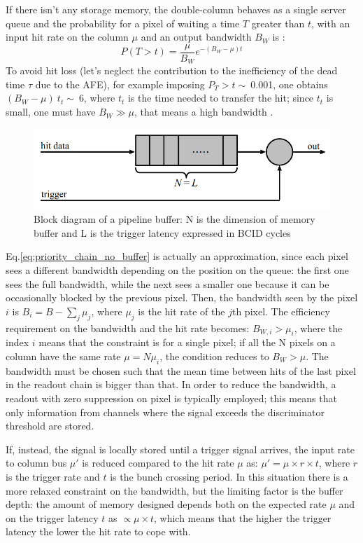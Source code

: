    If there isn't any storage memory, the double-column behaves as a single server queue and the probability for a pixel of waiting a time $T$ greater than $t$, with an input hit rate on the column $\mu$ and an output bandwidth $B_W$ is \cite{Garcia-Review}:
   \begin{equation}
   P(T > t) = \frac{\mu}{B_W} e^{-( B_W-\mu )t}
   \label{eq:priority_chain_no_buffer}
   \end{equation}
   To avoid hit loss (let's neglect the contribution to the inefficiency of the dead time $\tau$ due to the AFE), for example imposing $P_T > t\sim\:$0.001, one obtains $(B_W -\mu)\:t_t\sim\:$6, where $t_t$ is the time needed to transfer the hit; since $t_t$ is small, one must have $B_W \gg \mu$, that means a high bandwidth \cite{Garcia-Review}.
   \begin{figure}[h!]
      \centering
      \includegraphics[width=.6\linewidth]{figures/Pixel_detectors/pipeline.png}
      \caption{Block diagram of a pipeline buffer: N is the dimension of memory buffer and L is the trigger latency expressed in BCID cycles}
      \label{fig:pipeline}
   \end{figure}

   Eq.\ref{eq:priority_chain_no_buffer} is actually an approximation, since each pixel sees a different bandwidth depending on the position on the queue: the first one sees the full bandwidth, while the next sees a smaller one because it can be occasionally blocked by the previous pixel. Then, the bandwidth seen by the pixel $i$ is $B_{i} = B - \sum _{j}\mu_{j}$, where $\mu_j$ is the hit rate of the $j$th pixel.
   The efficiency requirement on the bandwidth and the hit rate becomes: $B_{W,i} > \mu_{i}$, where the index $i$ means that the constraint is for a single pixel; if all the N pixels on a column have the same rate $\mu = N\mu_{i}$, the condition reduces to $B_{W} > \mu$.
   The bandwidth must be chosen such that the mean time between hits of the last pixel in the readout chain is bigger than that.
   In order to reduce the bandwidth, a readout with zero suppression on pixel is typically employed; this means that only information from channels where the signal exceeds the discriminator threshold are stored. 

   If, instead, the signal is locally stored until a trigger signal arrives, the input rate to column bus $\mu '$ is reduced compared to the hit rate $\mu$ as: $\mu'=\mu \times r \times t$, where $r$ is the trigger rate and $t$ is the bunch crossing period.
   In this situation there is a more relaxed constraint on the bandwidth, but the limiting factor is the buffer depth: the amount of memory designed depends both on the expected rate $\mu$ and on the trigger latency $t$ as $\propto\mu \times t$, which means that the higher the trigger latency the lower the hit rate to cope with. 

